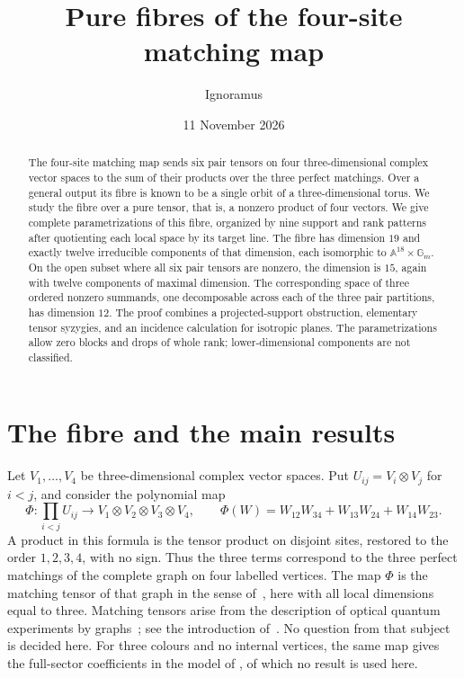 \documentclass[11pt,letterpaper]{article}
\title{Pure fibres of the four-site matching map}
\author{Ignoramus}
\date{11 November 2026}
\newcommand{\A}{\mathbb A}
\newcommand{\Gm}{\mathbb G_m}
\theoremstyle{definition}
\begin{document}
\maketitle
\begin{abstract}
The four-site matching map sends six pair tensors on four three-dimensional
complex vector spaces to the sum of their products over the three perfect
matchings. Over a general output its fibre is known to be a single orbit of
a three-dimensional torus. We study the fibre over a pure tensor, that is,
a nonzero product of four vectors. We give complete parametrizations of
this fibre, organized by nine support and rank patterns after quotienting
each local space by its target line. The fibre has dimension \(19\) and
exactly twelve irreducible components of that dimension, each isomorphic to
\(\A^{18}\times\Gm\). On the open subset where all six pair tensors are
nonzero, the dimension is \(15\), again with twelve components of maximal
dimension. The corresponding space of three ordered nonzero summands, one
decomposable across each of the three pair partitions, has dimension \(12\).
The proof combines a projected-support obstruction, elementary tensor
syzygies, and an incidence calculation for isotropic planes. The
parametrizations allow zero blocks and drops of whole rank;
lower-dimensional components are not classified.
\end{abstract}

\section{The fibre and the main results}

Let \(V_1,\ldots,V_4\) be three-dimensional complex vector spaces. Put
\(U_{ij}=V_i\otimes V_j\) for \(i<j\), and consider the polynomial map
\[
 \Phi:\prod_{i<j}U_{ij}\longrightarrow
 V_1\otimes V_2\otimes V_3\otimes V_4,\qquad
 \Phi(W)=W_{12}W_{34}+W_{13}W_{24}+W_{14}W_{23}.
\]
A product in this formula is the tensor product on disjoint sites, restored
to the order \(1,2,3,4\), with no sign. Thus the three terms correspond to
the three perfect matchings of the complete graph on four labelled vertices.
The map \(\Phi\) is the matching tensor of that graph in the sense
of~\cite{ign-geometry}, here with all local dimensions equal to three.
Matching tensors arise from the description of optical quantum experiments
by graphs~\cite{kgz}; see the introduction of~\cite{ign-geometry}. No
question from that subject is decided here. For three colours and no
internal vertices, the same map gives the full-sector coefficients in the
model of \cite[Section~2]{ign-boundary}, of which no result is used here.
\end{document}
